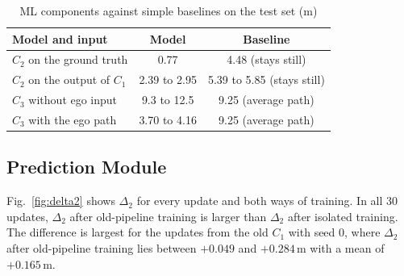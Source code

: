 \documentclass[conference]{IEEEtran}
\begin{document}
\begin{table}[t]
\centering
\caption{ML components against simple baselines on the test set (m)}
\label{tab:validity}
\footnotesize
\setlength{\tabcolsep}{4pt}
\begin{tabular}{@{}lcc@{}}
\toprule
\textbf{Model and input} & \textbf{Model} & \textbf{Baseline} \\
\midrule
$C_2$ on the ground truth & 0.77 & 4.48 (stays still) \\
$C_2$ on the output of $C_1$ & 2.39 to 2.95 & 5.39 to 5.85 (stays still) \\
$C_3$ without ego input & 9.3 to 12.5 & 9.25 (average path) \\
$C_3$ with the ego path & 3.70 to 4.16 & 9.25 (average path) \\
\bottomrule
\end{tabular}
\end{table}

\subsection{Prediction Module}
\label{sec:pred}
Fig.~\ref{fig:delta2} shows $\Delta_2$ for every update and both ways of training. In all 30 updates, $\Delta_2$ after old-pipeline training is larger than $\Delta_2$ after isolated training. The
difference is largest for the updates from the old $C_1$ with seed 0, where $\Delta_2$ after old-pipeline training lies between $+0.049$ and $+0.284$\,m with a mean of $+0.165$\,m.
\end{document}
